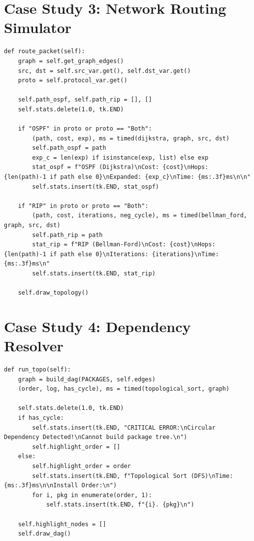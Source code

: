 \documentclass[12pt, a4paper, oneside]{report}
\theoremstyle{definition}
\begin{document}
\section{Case Study 3: Network Routing Simulator}

\begin{lstlisting}[caption={Dijkstra (OSPF) and Bellman-Ford (RIP) integration (from network\_routing.py)},
                   basicstyle=\ttfamily\footnotesize]
def route_packet(self):
    graph = self.get_graph_edges()
    src, dst = self.src_var.get(), self.dst_var.get()
    proto = self.protocol_var.get()
    
    self.path_ospf, self.path_rip = [], []
    self.stats.delete(1.0, tk.END)
    
    if "OSPF" in proto or proto == "Both":
        (path, cost, exp), ms = timed(dijkstra, graph, src, dst)
        self.path_ospf = path
        exp_c = len(exp) if isinstance(exp, list) else exp
        stat_ospf = f"OSPF (Dijkstra)\nCost: {cost}\nHops: {len(path)-1 if path else 0}\nExpanded: {exp_c}\nTime: {ms:.3f}ms\n\n"
        self.stats.insert(tk.END, stat_ospf)
        
    if "RIP" in proto or proto == "Both":
        (path, cost, iterations, neg_cycle), ms = timed(bellman_ford, graph, src, dst)
        self.path_rip = path
        stat_rip = f"RIP (Bellman-Ford)\nCost: {cost}\nHops: {len(path)-1 if path else 0}\nIterations: {iterations}\nTime: {ms:.3f}ms\n"
        self.stats.insert(tk.END, stat_rip)
        
    self.draw_topology()
\end{lstlisting}

\section{Case Study 4: Dependency Resolver}

\begin{lstlisting}[caption={Topological Sort integration with cycle detection (from dependency\_resolver.py)},
                   basicstyle=\ttfamily\footnotesize]
def run_topo(self):
    graph = build_dag(PACKAGES, self.edges)
    (order, log, has_cycle), ms = timed(topological_sort, graph)
    
    self.stats.delete(1.0, tk.END)
    if has_cycle:
        self.stats.insert(tk.END, "CRITICAL ERROR:\nCircular Dependency Detected!\nCannot build package tree.\n")
        self.highlight_order = []
    else:
        self.highlight_order = order
        self.stats.insert(tk.END, f"Topological Sort (DFS)\nTime: {ms:.3f}ms\n\nInstall Order:\n")
        for i, pkg in enumerate(order, 1):
            self.stats.insert(tk.END, f"{i}. {pkg}\n")
    
    self.highlight_nodes = []
    self.draw_dag()
\end{lstlisting}
\end{document}
